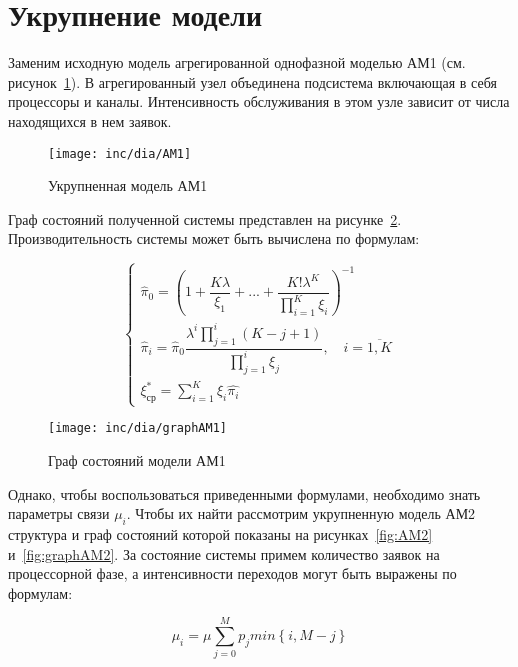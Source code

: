 \documentclass[utf8x, 12pt]{G7-32} %
\begin{document}
\newpage

\section{Укрупнение модели}

Заменим исходную модель агрегированной однофазной моделью АМ1 (см. рисунок~\ref{fig:AM1}). В агрегированный узел объединена подсистема включающая в себя процессоры и каналы. Интенсивность обслуживания в этом узле зависит от числа находящихся в нем заявок.

\begin{figure}[ht]
\centering
\texttt{[image: inc/dia/AM1]}
\caption{Укрупненная модель АМ1}
\label{fig:AM1}
\end{figure}

Граф состояний полученной системы представлен на рисунке~\ref{fig:graphAM1}. Производительность системы может быть вычислена по формулам:


\begin{equation}
\label{eq:AM1}
\left\{
   \begin{array}{lcl}
	\hat{\pi}_{0} = \left( 1 + \dfrac{K \lambda}{\xi_1} +  ... + \dfrac{K! \lambda^{K}}{\prod \limits_{i=1}^K \xi_i} \right) ^{-1} \\
	\hat{\pi}_{i} = \hat{\pi}_{0} \dfrac{\lambda^{i}\prod \limits_{j=1}^{i} (K-j+1)}{\prod \limits_{j=1}^i \xi_{j}}, \quad i = \overline{1,K}  \\ 
	\xi_{ср}^{*}=\sum \limits_{i=1}^K \xi_i \hat{\pi_i}
   \end{array}
\right.
\end{equation}


\begin{figure}[ht]
\centering
\texttt{[image: inc/dia/graphAM1]}
\caption{Граф состояний модели АМ1}
\label{fig:graphAM1}
\end{figure}

Однако, чтобы воспользоваться приведенными формулами, необходимо знать параметры связи $\mu_i$. Чтобы их найти рассмотрим укрупненную модель АМ2 структура и граф состояний которой показаны на рисунках~\ref{fig:AM2} и~\ref{fig:graphAM2}. За состояние системы примем количество заявок на процессорной фазе, а интенсивности переходов могут быть выражены по формулам:

\begin{equation}
\label{eq:mu}
\mu_i = \mu \sum \limits_{j=0}^M p_j min \left\lbrace i, M-j \right\rbrace
\end{equation}
\end{document}
